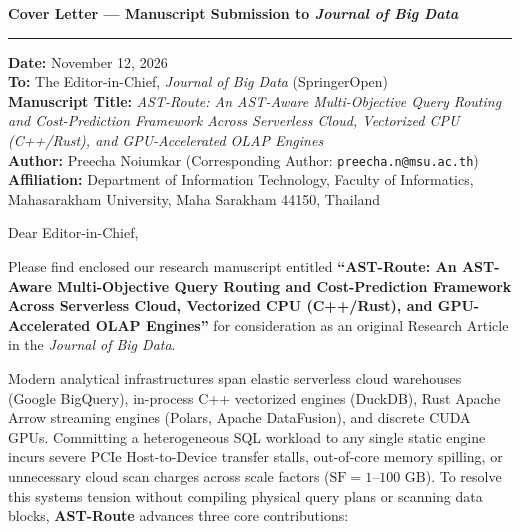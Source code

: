 \documentclass[11pt,a4paper]{article}
\begin{document}
{\Large\textbf{Cover Letter --- Manuscript Submission to \textit{Journal of Big Data}}}
\vspace{4pt}
\hrule
\vspace{8pt}

\textbf{Date:} November 12, 2026\\
\textbf{To:} The Editor-in-Chief, \textit{Journal of Big Data} (SpringerOpen)\\
\textbf{Manuscript Title:} \textit{AST-Route: An AST-Aware Multi-Objective Query Routing and Cost-Prediction Framework Across Serverless Cloud, Vectorized CPU (C++/Rust), and GPU-Accelerated OLAP Engines}\\
\textbf{Author:} Preecha Noiumkar (Corresponding Author: \texttt{preecha.n@msu.ac.th})\\
\textbf{Affiliation:} Department of Information Technology, Faculty of Informatics, Mahasarakham University, Maha Sarakham 44150, Thailand

\vspace{6pt}
Dear Editor-in-Chief,

Please find enclosed our research manuscript entitled \textbf{``AST-Route: An AST-Aware Multi-Objective Query Routing and Cost-Prediction Framework Across Serverless Cloud, Vectorized CPU (C++/Rust), and GPU-Accelerated OLAP Engines''} for consideration as an original Research Article in the \textit{Journal of Big Data}.

Modern analytical infrastructures span elastic serverless cloud warehouses (Google BigQuery), in-process C++ vectorized engines (DuckDB), Rust Apache Arrow streaming engines (Polars, Apache DataFusion), and discrete CUDA GPUs. Committing a heterogeneous SQL workload to any single static engine incurs severe PCIe Host-to-Device transfer stalls, out-of-core memory spilling, or unnecessary cloud scan charges across scale factors ($\text{SF}=1\text{--}100\text{ GB}$). To resolve this systems tension without compiling physical query plans or scanning data blocks, \textbf{AST-Route} advances three core contributions:
\end{document}
